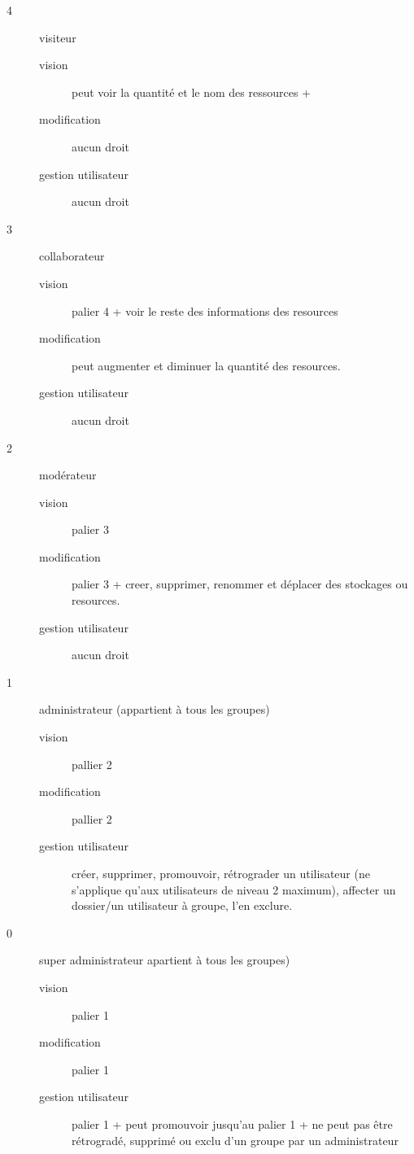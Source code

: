 \documentclass[a4paper, 12pt]{report}
\begin{document}
			\begin{description}
				\item [4] visiteur
					\begin{description}
						\item [vision] peut voir la quantité et le nom des ressources + 
						\item [modification] aucun droit
						\item [gestion utilisateur] aucun droit
					\end{description}

				\item [3] collaborateur
					\begin{description}
						\item [vision] palier 4 + voir le reste des informations des resources
						\item [modification] peut augmenter et diminuer la quantité des resources.
						\item [gestion utilisateur] aucun droit
					\end{description}

				\item [2] modérateur
					\begin{description}
						\item [vision] palier 3
						\item [modification] palier 3 + creer, supprimer, renommer et déplacer des stockages ou resources.
						\item [gestion utilisateur] aucun droit
					\end{description}

				\item [1] administrateur (appartient à tous les groupes)
					\begin{description}
						\item [vision] pallier 2
						\item [modification] pallier 2
						\item [gestion utilisateur] créer, supprimer, promouvoir, rétrograder un utilisateur (ne s'applique qu'aux utilisateurs de niveau 2 maximum), affecter un dossier/un utilisateur à groupe, l'en exclure.
					\end{description}

				\item [0] super administrateur apartient à tous les groupes)
					\begin{description}
						\item [vision] palier 1
						\item [modification] palier 1
						\item [gestion utilisateur] palier 1 + peut promouvoir jusqu'au palier 1 + ne peut pas être rétrogradé, supprimé ou exclu d'un groupe par un administrateur
					\end{description}
			\end{description}	


		
\end{document}

